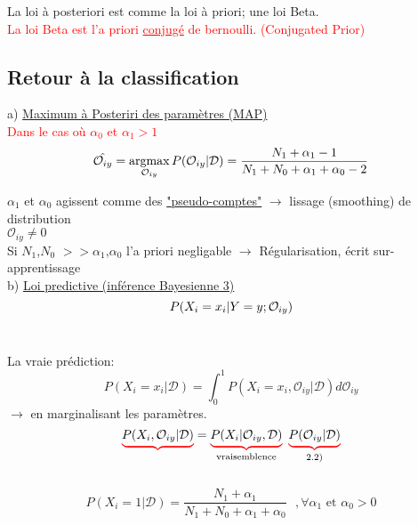 \documentclass{article}
\newcommand{\argmax}{\operatornamewithlimits{argmax }}
\def\cunderbrace#1#2{\color{#1}\underbrace{{\color{black}#2}}\color{black}}
\newcommand{\tikzmark}[1]{\tikz[baseline,remember picture] \coordinate (#1) {};}
\begin{document}
La loi à posteriori est comme la loi à priori; une loi Beta.\\
\textcolor{red}{La loi Beta est l'a priori \underline{conjugé} de bernoulli. (Conjugated Prior)}\\

\subsection{Retour à la classification} 
a) \underline{Maximum à Posteriri des paramètres (MAP)} \\
\textcolor{red}{Dans le cas où $\alpha_0$ et $\alpha_1 > 1$}\\
$$\hat{\mathcal{O}_{iy}} = \argmax_{\mathcal{O}_{iy}} P(\mathcal{O}_{iy}|\mathcal{D}) \\ = \frac{N_1\tikzmark{Plus}+\alpha_1-1}{N_1+N_0+\alpha_1+\alpha_0-2}$$
\vspace{2em}

\textbullet $\alpha_1$ et $\alpha_0$ agissent comme des \color{red}\underline{\color{black}"pseudo-comptes"}\color{black} $\rightarrow$ lissage (smoothing) de distribution \\
\textbullet $\mathcal{O}_{iy} \neq 0$ \\
\textbullet Si $N_1$,$N_0$ $>> \alpha_1$,$\alpha_0$ l'a priori negligable $\rightarrow$ Régularisation, écrit sur-apprentissage\\

b) \underline{Loi predictive (inférence Bayesienne 3)} \\
$$P(X_i=x_i|Y=y;\tikzmark{O2}\mathcal{O}_{iy})$$ \\

La vraie prédiction: $$P(X_i=x_i|\mathcal{D}) = \int_{0}^{1} P(X_i=x_i,\mathcal{O}_{iy}|\mathcal{D}) d\mathcal{O}_{iy}$$ 
$\rightarrow$ en marginalisant les paramètres. \\

$$\cunderbrace{red}{P(X_i,\mathcal{O}_{iy}|\mathcal{D})} = \color{red}\underbrace{\color{black}P(X_i|\mathcal{O}_{iy},\mathcal{D})}_\text{\color{black}vraisemblence}\ \color{red}\underbrace{\color{black}P(\mathcal{O}_{iy}|\mathcal{D})}_\text{\color{black}2.2)}$$ \\
$$P(X_i=1|\mathcal{D})=\frac{N_1+\alpha_1}{N_1+N_0+\alpha_1+\alpha_0} ~~~ ,\forall\alpha_1\text{ et }\alpha_0 > 0$$\\
\end{document}
